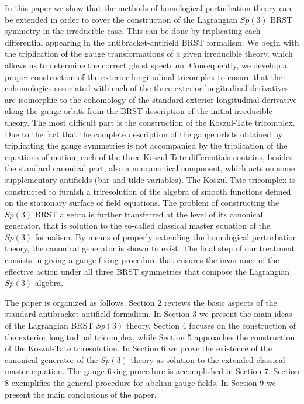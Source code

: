 \documentclass[a4paper,12pt]{article}
\begin{document}
In this paper we show that the methods of homological perturbation theory
can be extended in order to cover the construction of the Lagrangian $Sp(3)$
BRST symmetry in the irreducible case. This can be done by triplicating each
differential appearing in the antibracket-antifield BRST formalism. We begin
with the triplication of the gauge transformations of a given irreducible
theory, which allows us to determine the correct ghost spectrum.
Consequently, we develop a proper construction of the exterior longitudinal
tricomplex to ensure that the cohomologies associated with each of the three
exterior longitudinal derivatives are isomorphic to the cohomology of the
standard exterior longitudinal derivative along the gauge orbits from the
BRST description of the initial irreducible theory. The most difficult part
is the construction of the Koszul-Tate tricomplex. Due to the fact that the
complete description of the gauge orbits obtained by triplicating the gauge
symmetries is not accompanied by the triplication of the equations of
motion, each of the three Koszul-Tate differentials contains, besides the
standard canonical part, also a noncanonical component, which acts on some
supplementary antifields (bar and tilde variables). The Koszul-Tate
tricomplex is constructed to furnish a triresolution of the algebra of
smooth functions defined on the stationary surface of field equations. The
problem of constructing the $Sp(3)$ BRST algebra is further transferred at
the level of its canonical generator, that is solution to the so-called
classical master equation of the $Sp(3)$ formalism. By means of properly
extending the homological perturbation theory, the canonical generator is
shown to exist. The final step of our treatment consists in giving a
gauge-fixing procedure that ensures the invariance of the effective action
under all three BRST symmetries that compose the Lagrangian $Sp(3)$ algebra.

The paper is organized as follows. Section 2 reviews the basic aspects of
the standard antibracket-antifield formalism. In Section 3 we present the
main ideas of the Lagrangian BRST $Sp(3)$ theory. Section 4 focuses on the
construction of the exterior longitudinal tricomplex, while Section 5
approaches the construction of the Koszul-Tate triresolution. In Section 6
we prove the existence of the canonical generator of the $Sp(3)$ theory as
solution to the extended classical master equation. The gauge-fixing
procedure is accomplished in Section 7. Section 8 exemplifies the general
procedure for abelian gauge fields. In Section 9 we present the main
conclusions of the paper.
\end{document}
